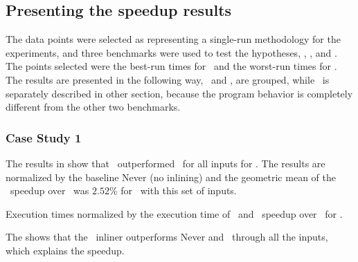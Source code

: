 \subsection{Presenting the speedup results}
\label{sec:speedupresult}

The data points were selected as representing a single-run methodology for the experiments, and three benchmarks were used to test the hypotheses, \bzip, \gzip, and \gcc. The points selected were the best-run times for \FDI\ and the worst-run times for \llvm. The results are presented in the following way, \bzip\ and \gzip, are grouped, while \gcc\ is separately described in other section, because the program behavior is completely different from the other two benchmarks.

\subsubsection{Case Study 1 \gcc}

The results in  show that \FDI\ outperformed \llvm\ for all inputs for \gcc. The results are normalized by the baseline Never (no inlining) and the geometric mean of the
\FDI\  speedup over \llvm\ was $2.52 \%$  for \gcc\ with this set of inputs.


\begin{table}
  \centering
  \begin{tiny}
  
  \end{tiny}
  \caption{Execution times normalized by the execution time of \Never\ and \FDI\ speedup over \llvm\ for \gcc.}
  \label{tab:speedupgcc}
\end{table}

The  shows that the \FDI\ inliner outperforms Never and \llvm\ through all the inputs, which explains the speedup.


